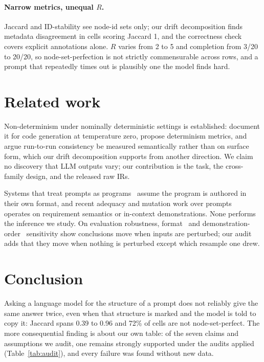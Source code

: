 \documentclass{article}
\begin{document}
\paragraph{Narrow metrics, unequal $R$.}
Jaccard and ID-stability see node-id sets only; our drift decomposition finds metadata disagreement in cells scoring Jaccard 1, and the correctness check covers explicit annotations alone. $R$ varies from 2 to 5 and completion from 3/20 to 20/20, so node-set-perfection is not strictly commensurable across rows, and a prompt that repeatedly times out is plausibly one the model finds hard.

\section{Related work}
\label{sec:related}

Non-determinism under nominally deterministic settings is established: \citet{ouyang2025nondeterminism} document it for code generation at temperature zero, \citet{atil2025nondeterminism} propose determinism metrics, and \citet{yao2026consistency} argue run-to-run consistency be measured semantically rather than on surface form, which our drift decomposition supports from another direction. We claim no discovery that LLM outputs vary; our contribution is the task, the cross-family design, and the released raw IRs.

Systems that treat prompts as programs~\citep{beurerkellner2023lmql,khattab2024dspy} assume the program is authored in their own format, and recent adequacy and mutation work over prompts~\citep{tambon2026promptcoverage,tan2026skillcoverage,wei2024mile} operates on requirement semantics or in-context demonstrations. None performs the inference we study. On evaluation robustness, format~\citep{sclar2024sensitivity} and demonstration-order~\citep{lu2022fantastically} sensitivity show conclusions move when inputs are perturbed; our audit adds that they move when nothing is perturbed except which resample one drew.

\section{Conclusion}

Asking a language model for the structure of a prompt does not reliably give the same answer twice, even when that structure is marked and the model is told to copy it: Jaccard spans 0.39 to 0.96 and 72\% of cells are not node-set-perfect. The more consequential finding is about our own table: of the seven claims and assumptions we audit, one remains strongly supported under the audits applied (Table~\ref{tab:audit}), and every failure was found without new data.
\end{document}
